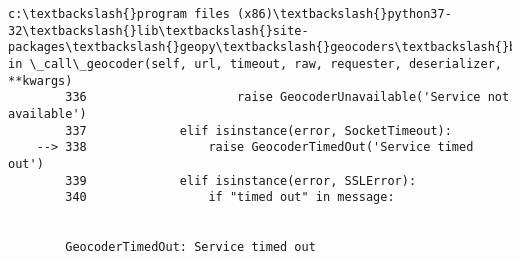 \documentclass[11pt]{article}
\begin{document}
\begin{Verbatim}[commandchars=\\\{\}]
        c:\textbackslash{}program files (x86)\textbackslash{}python37-32\textbackslash{}lib\textbackslash{}site-packages\textbackslash{}geopy\textbackslash{}geocoders\textbackslash{}base.py in \_call\_geocoder(self, url, timeout, raw, requester, deserializer, **kwargs)
        336                     raise GeocoderUnavailable('Service not available')
        337             elif isinstance(error, SocketTimeout):
    --> 338                 raise GeocoderTimedOut('Service timed out')
        339             elif isinstance(error, SSLError):
        340                 if "timed out" in message:
    

        GeocoderTimedOut: Service timed out

    \end{Verbatim}


    
    
    
    
\end{document}
